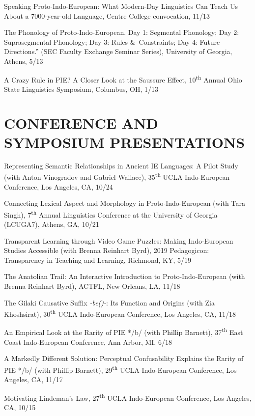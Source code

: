 \documentclass[paper=letter,fontsize=11pt,enabledeprecatedfontcommands]{scrartcl} %
\newcommand{\NewPart}[2]{\section*{\uppercase{#1} #2}}
\newcommand{\TalkEntry}[4]{
		\noindent #1, #2, #3 #4}
\begin{document}
\begin{etaremune}
\item\TalkEntry{Speaking Proto-Indo-European: What Modern-Day Linguistics Can Teach Us About a 7000-year-old Language}{Centre College convocation}{11/13}
\item\TalkEntry{The Phonology of Proto-Indo-European. Day 1: Segmental Phonology; Day 2: Suprasegmental Phonology; Day 3: Rules \&~Constraints; Day 4: Future Directions.” (SEC Faculty Exchange Seminar Series)}{University of Georgia, Athens}{5/13}
\item\TalkEntry{A Crazy Rule in PIE? A Closer Look at the Saussure Effect}{10\textsuperscript{th} Annual Ohio State Linguistics Symposium, Columbus, OH}{1/13}
\end{etaremune}

\NewPart{Conference and Symposium Presentations}{}
\begin{etaremune}
\item\TalkEntry{Representing Semantic Relationships in Ancient IE Languages: A Pilot Study (with Anton Vinogradov and Gabriel Wallace)}{35\textsuperscript{th} UCLA Indo-European Conference, Los Angeles, CA}{10/24}
\item\TalkEntry{Connecting Lexical Aspect and Morphology in Proto-Indo-European (with Tara Singh)}{7\textsuperscript{th} Annual Linguistics Conference at the University of Georgia (LCUGA7), Athens, GA}{10/21}
\item\TalkEntry{Transparent Learning through Video Game Puzzles: Making Indo-European Studies Accessible (with Brenna Reinhart Byrd)}{2019 Pedagogicon: Transparency in Teaching and Learning, Richmond, KY}{5/19}
\item\TalkEntry{The Anatolian Trail: An Interactive Introduction to Proto-Indo-European (with Brenna Reinhart Byrd)}{ACTFL, New Orleans, LA}{11/18}
\item\TalkEntry{The Gilaki Causative Suffix \textit{-be(\textlengthmark)-}: Its Function and Origins (with Zia Khoshsirat)}{30\textsuperscript{th} UCLA Indo-European Conference, Los Angeles, CA}{11/18}
\item\TalkEntry{An Empirical Look at the Rarity of PIE */b/ (with Phillip Barnett)}{37\textsuperscript{th} East Coast Indo-European Conference, Ann Arbor, MI}{6/18}
\item\TalkEntry{A Markedly Different Solution: Perceptual Confusability Explains the Rarity of PIE */b/ (with Phillip Barnett)}{29\textsuperscript{th} UCLA Indo-European Conference, Los Angeles, CA}{11/17}
\item\TalkEntry{Motivating Lindeman’s Law}{27\textsuperscript{th} UCLA Indo-European Conference, Los Angeles, CA}{10/15}

\end{etaremune}
\end{document}
